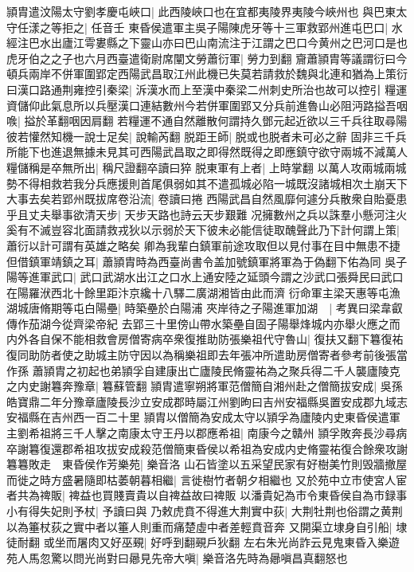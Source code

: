 頴胄遣汶陽太守劉孝慶屯峽口|{
	此西陵峽口也在宜都夷陵界夷陵今峽州也}
與巴東太守任漾之等拒之|{
	任音壬}
東昏侯遣軍主吳子陽陳虎牙等十三軍救郢州進屯巴口|{
	水經注巴水出廬江雩婁縣之下靈山亦曰巴山南流注于江謂之巴口今黄州之巴河口是也}
虎牙伯之之子也六月西臺遣衛尉席闡文勞蕭衍軍|{
	勞力到翻}
齎蕭頴胄等議謂衍曰今頓兵兩岸不併軍圍郢定西陽武昌取江州此機已失莫若請救於魏與北連和猶為上策衍曰漢口路通荆雍控引秦梁|{
	泝漢水而上至漢中秦梁二州刺史所治也故可以控引}
糧運資儲仰此氣息所以兵壓漢口連結數州今若併軍圍郢又分兵前進魯山必阻沔路搤吾咽㗋|{
	搤於革翻咽因肩翻}
若糧運不通自然離散何謂持久鄧元起近欲以三千兵往取尋陽彼若懽然知機一說士足矣|{
	說輸芮翻}
脱距王師|{
	脱或也脱者未可必之辭}
固非三千兵所能下也進退無據未見其可西陽武昌取之即得然既得之即應鎮守欲守兩城不減萬人糧儲稱是卒無所出|{
	稱尺證翻卒讀曰猝}
脱東軍有上者|{
	上時掌翻}
以萬人攻兩城兩城勢不得相救若我分兵應援則首尾俱弱如其不遣孤城必陷一城既沒諸城相次土崩天下大事去矣若郢州既拔席卷沿流|{
	卷讀曰捲}
西陽武昌自然風靡何遽分兵散衆自貽憂患乎且丈夫舉事欲清天步|{
	天步天路也詩云天步艱難}
况擁數州之兵以誅羣小懸河注火奚有不滅豈容北面請救戎狄以示弱於天下彼未必能信徒取醜聲此乃下計何謂上策|{
	蕭衍以計可謂有英雄之略矣}
卿為我輩白鎮軍前途攻取但以見付事在目中無患不捷但借鎮軍靖鎮之耳|{
	蕭頴胄時為西臺尚書令盖加號鎮軍將軍為于偽翻下佑為同}
吳子陽等進軍武口|{
	武口武湖水出江之口水上通安陸之延頭今謂之沙武口張舜民曰武口在陽羅洑西北十餘里距汴京纔十八驛二廣湖湘皆由此而濟}
衍命軍主梁天惠等屯漁湖城唐脩期等屯白陽壘|{
	時築壘於白陽浦}
夾岸待之子陽進軍加湖　|{
	考異曰梁韋叡傳作茄湖今從齊梁帝紀}
去郢三十里傍山帶水築壘自固子陽舉烽城内亦舉火應之而内外各自保不能相救會房僧寄病卒衆復推助防張樂祖代守魯山|{
	復扶又翻下篹復祐復同助防者使之助城主防守因以為稱樂祖即去年張冲所遣助房僧寄者參考前後張當作孫}
蕭頴胄之初起也弟頴孚自建康出亡廬陵民脩靈祐為之聚兵得二千人襲廬陵克之内史謝篹奔豫章|{
	篹蘇管翻}
頴胄遣寧朔將軍范僧簡自湘州赴之僧簡拔安成|{
	吳孫皓寶鼎二年分豫章廬陵長沙立安成郡時屬江州劉昫曰吉州安福縣吳置安成郡九域志安福縣在吉州西一百二十里}
頴胄以僧簡為安成太守以頴孚為廬陵内史東昏侯遣軍主劉希祖將三千人擊之南康太守王丹以郡應希祖|{
	南康今之贛州}
頴孚敗奔長沙尋病卒謝篹復還郡希祖攻拔安成殺范僧簡東昏侯以希祖為安成内史脩靈祐復合餘衆攻謝篹篹敗走　東昏侯作芳樂苑|{
	樂音洛}
山石皆塗以五采望民家有好樹美竹則毁牆撤屋而徙之時方盛暑隨即枯萎朝暮相繼|{
	言徙樹竹者朝夕相繼也}
又於苑中立市使宮人宦者共為禆販|{
	禆益也買賤賣貴以自禆益故曰禆販}
以潘貴妃為市令東昏侯自為市録事小有得失妃則予杖|{
	予讀曰與}
乃敕虎賁不得進大荆實中荻|{
	大荆牡荆也俗謂之黄荆以為箠杖荻之實中者以箠人則重而痛楚虛中者差輕賁音奔}
又開渠立埭身自引船|{
	埭徒耐翻}
或坐而屠肉又好巫覡|{
	好呼到翻覡戶狄翻}
左右朱光尚詐云見鬼東昏入樂遊苑人馬忽驚以問光尚對曰曏見先帝大嗔|{
	樂音洛先時為曏嗔昌真翻怒也}
